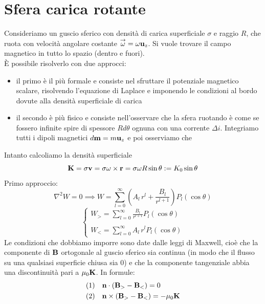 \section{Sfera carica rotante}
Consideriamo un guscio sferico con densità di carica superficiale $ \sigma $ e raggio $ R $, che ruota con velocità angolare 
costante $ \overset{\to}{\omega} = \omega \mathbf{ u }_z $. Si vuole trovare il campo magnetico in tutto lo spazio (dentro e fuori).\\
È possibile risolverlo con due approcci: 
\begin{itemize}
  \item il primo è il più formale e consiste nel sfruttare il potenziale magnetico scalare, risolvendo l'equazione di 
  Laplace e imponendo le condizioni al bordo dovute alla densità superficiale di carica
  \item il secondo è più fisico e consiste nell'osservare che la sfera ruotando è come se fossero infinite spire di spessore $ Rd\theta $ ognuna con 
  una corrente $ \Delta i $. Integriamo tutti i dipoli magnetici $ d\mathbf{ m } = m \mathbf{ u }_z $ e poi osserviamo che
\end{itemize}
Intanto calcoliamo la densità superficiale
\begin{equation}
  \mathbf{ K } = \sigma \mathbf{ v } = \sigma \mathbf{ \omega } \times \mathbf{ r } = \sigma \omega R \sin \theta := K_0 \sin \theta
\end{equation}
Primo approccio:
\begin{equation}
  \nabla^2 W = 0 \implies W = \sum_{l=0}^{\infty} \left( A_l \, r^l + \frac{B_l}{r^{l+1}} \right) P_l\left( \cos \theta \right) 
\end{equation}
\[
\begin{cases}
  W_> = \sum_{l=0}^{\infty}  \frac{B_l}{r^{l+1}} P_l\left( \cos \theta \right) \\
  \\
  W_< = \sum_{l=0}^{\infty}  A_l \, r^l  P_l\left( \cos \theta \right) 
\end{cases}
\]
Le condizioni che dobbiamo imporre sono date dalle leggi di Maxwell, cioè che la componente di $ \mathbf{ B } $ ortogonale al guscio sferico sia continua 
(in modo che il flusso su una qualsiasi superficie chiusa sia $ 0 $) e che la componente tangenziale abbia una discontinuità pari a $ \mu_0 \mathbf{ K } $.
In formule:
\begin{align}
  &(1) \quad \mathbf{ n } \cdot \left( \mathbf{ B_> - B_< } \right) = 0\\
  &(2) \quad \mathbf{ n } \times \left( \mathbf{ B_> - B_< } \right) = - \mu_0 \mathbf{ K }
\end{align}
